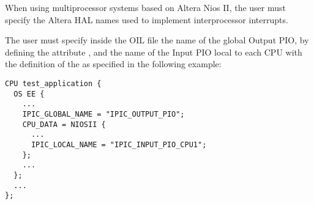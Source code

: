 When using multiprocessor systems based on Altera Nios II, the user
must specify the Altera HAL names used to implement 
interprocessor interrupts.

The user must specify inside the OIL file the name of the global
Output PIO, by defining the attribute , and
the name of the Input PIO local to each CPU with the definition of the
 as specified in the following example:

\begin{lstlisting}
CPU test_application {
  OS EE {
    ...
    IPIC_GLOBAL_NAME = "IPIC_OUTPUT_PIO";
    CPU_DATA = NIOSII {
      ...
      IPIC_LOCAL_NAME = "IPIC_INPUT_PIO_CPU1";
    };
    ...
  };
  ...
};
\end{lstlisting}
